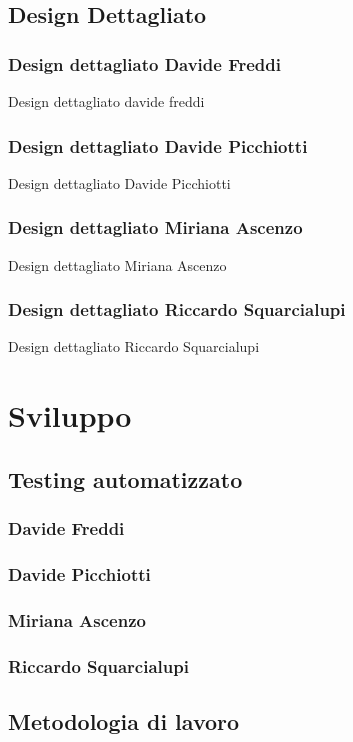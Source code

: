 \documentclass[a4paper,12pt]{report}
\begin{document}
\section{Design Dettagliato}

\subsection{Design dettagliato Davide Freddi}
Design dettagliato davide freddi

\subsection{Design dettagliato Davide Picchiotti}
Design dettagliato Davide Picchiotti

\subsection{Design dettagliato Miriana Ascenzo}
Design dettagliato Miriana Ascenzo

\subsection{Design dettagliato Riccardo Squarcialupi}
Design dettagliato Riccardo Squarcialupi

\chapter{Sviluppo}
\section{Testing automatizzato}

\subsection{Davide Freddi}
\subsection{Davide Picchiotti}
\subsection{Miriana Ascenzo}
\subsection{Riccardo Squarcialupi}

\section{Metodologia di lavoro}
\end{document}
